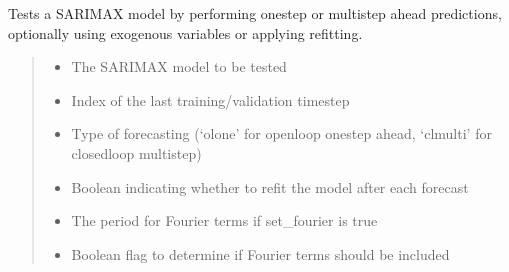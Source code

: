 \documentclass[letterpaper,10pt,english]{sphinxmanual}
\begin{document}
\begin{fulllineitems}
\begin{fulllineitems}
\label{\detokenize{docs/SARIMA_model:SARIMA_model.SARIMA_Predictor.test_model}}
\pysigstartsignatures
{}
\pysigstopsignatures
\sphinxAtStartPar
Tests a SARIMAX model by performing one\sphinxhyphen{}step or multi\sphinxhyphen{}step ahead predictions, optionally using exogenous variables or applying refitting.
\begin{quote}\begin{description}
\begin{itemize}
\item {} 
\sphinxAtStartPar
{} \textendash{} The SARIMAX model to be tested

\item {} 
\sphinxAtStartPar
{} \textendash{} Index of the last training/validation timestep

\item {} 
\sphinxAtStartPar
{} \textendash{} Type of forecasting (‘ol\sphinxhyphen{}one’ for open\sphinxhyphen{}loop one\sphinxhyphen{}step ahead, ‘cl\sphinxhyphen{}multi’ for closed\sphinxhyphen{}loop multi\sphinxhyphen{}step)

\item {} 
\sphinxAtStartPar
{} \textendash{} Boolean indicating whether to refit the model after each forecast

\item {} 
\sphinxAtStartPar
{} \textendash{} The period for Fourier terms if set\_fourier is true

\item {} 
\sphinxAtStartPar
{} \textendash{} Boolean flag to determine if Fourier terms should be included

\end{itemize}


\end{description}
\end{quote}
\end{fulllineitems}
\end{fulllineitems}
\end{document}
